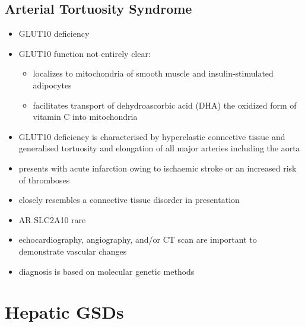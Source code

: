 \documentclass{scrartcl}
\begin{document}
\subsection{Arterial Tortuosity Syndrome}
\label{sec:org7637da5}
\begin{itemize}
\item GLUT10 deficiency
\item GLUT10 function not entirely clear:
\begin{itemize}
\item localizes to mitochondria of smooth muscle and insulin-stimulated adipocytes
\item facilitates transport of dehydroascorbic acid (DHA) the
oxidized form of vitamin C into mitochondria
\end{itemize}
\item GLUT10 deficiency is characterised by hyperelastic connective tissue
and generalised tortuosity and elongation of all major arteries
including the aorta
\item presents with acute infarction owing to ischaemic stroke or an
increased risk of thromboses
\item closely resembles a connective tissue disorder in presentation
\item AR SLC2A10 rare
\item echocardiography, angiography, and/or CT scan are important to demonstrate vascular changes
\item diagnosis is based on molecular genetic methods
\end{itemize}
\section{Hepatic GSDs}
\label{sec:org735c078}
\end{document}
